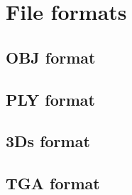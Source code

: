 \chapter{File formats}
\section{OBJ format}
\section{PLY format}
\section{3Ds format}
\section{TGA format}